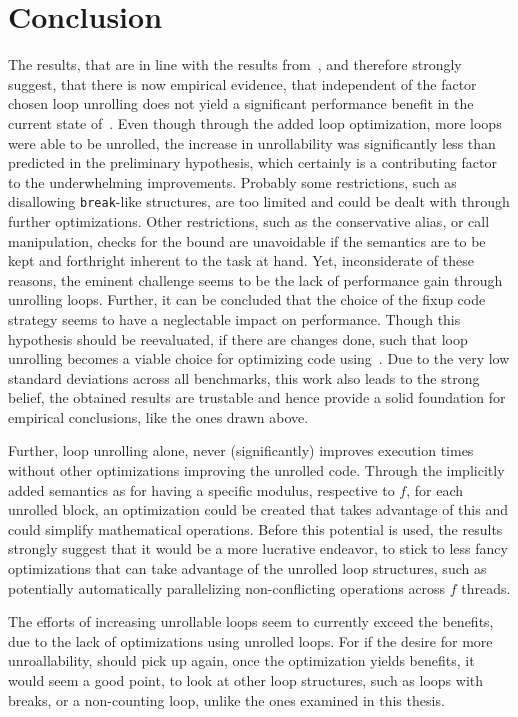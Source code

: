 \chapter{Conclusion}\label{sec:conclusion}

The results, that are in line with the results from~\cite{aebi18bachelorarbeit}, and therefore strongly suggest, that there is now empirical evidence, that independent of the factor chosen loop unrolling does not yield a significant performance benefit in the current state of~\libFIRM.
Even though through the added loop optimization, more loops were able to be unrolled, the increase in unrollability was significantly less than predicted in the preliminary hypothesis, which certainly is a contributing factor to the underwhelming improvements.
Probably some restrictions, such as disallowing \texttt{break}-like structures, are too limited and could be dealt with through further optimizations.
Other restrictions, such as the conservative alias, or call manipulation, checks for the bound are unavoidable if the semantics are to be kept and forthright inherent to the task at hand.
Yet, inconsiderate of these reasons, the eminent challenge seems to be the lack of performance gain through unrolling loops.
Further, it can be concluded that the choice of the fixup code strategy seems to have a neglectable impact on performance.
Though this hypothesis should be reevaluated, if there are changes done, such that loop unrolling becomes a viable choice for optimizing code using~\libFIRM.
Due to the very low standard deviations across all benchmarks, this work also leads to the strong belief, the obtained results are trustable and hence provide a solid foundation for empirical conclusions, like the ones drawn above.

Further, loop unrolling alone, never (significantly) improves execution times without other optimizations improving the unrolled code.
Through the implicitly added semantics as for having a specific modulus, respective to $f$, for each unrolled block, an optimization could be created that takes advantage of this and could simplify mathematical operations.
Before this potential is used, the results strongly suggest that it would be a more lucrative endeavor, to stick to less fancy optimizations that can take advantage of the unrolled loop structures, such as potentially automatically parallelizing non-conflicting operations across $f$ threads. %

The efforts of increasing unrollable loops seem to currently exceed the benefits, due to the lack of optimizations using unrolled loops.
For if the desire for more unroallability, should pick up again, once the optimization yields benefits, it would seem a good point, to look at other loop structures, such as loops with breaks, or a non-counting loop, unlike the ones examined in this thesis.
